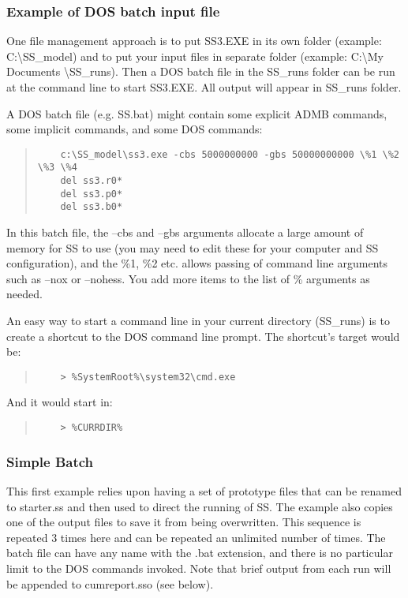 \subsubsection{Example of DOS batch input file}
One file management approach is to put SS3.EXE in its own folder (example:  C:\textbackslash SS\_model) and to put your input files in separate folder (example:  C:\textbackslash My Documents \textbackslash SS\_runs).  Then a DOS batch file in the SS\_runs folder can be run at the command line to start SS3.EXE.  All output will appear in SS\_runs folder.

A DOS batch file (e.g. SS.bat) might contain some explicit ADMB commands, some implicit commands, and some DOS commands:

\begin{quote}
	\begin{verbatim}
	c:\SS_model\ss3.exe -cbs 5000000000 -gbs 50000000000 \%1 \%2 \%3 \%4 
	del ss3.r0*
	del ss3.p0*
	del ss3.b0*
	\end{verbatim}
\end{quote}


In this batch file, the –cbs and –gbs arguments allocate a large amount of memory for SS to use (you may need to edit these for your computer and SS configuration), and the \%1, \%2 etc. allows passing of command line arguments such as –nox or –nohess.  You add more items to the list of \% arguments as needed.

An easy way to start a command line in your current directory (SS\_runs) is to create a shortcut to the DOS command line prompt.  The shortcut’s target would be:

\begin{quote}
	\begin{verbatim}
	> %SystemRoot%\system32\cmd.exe
	\end{verbatim}
\end{quote}


\noindent And it would start in:
\begin{quote}
	\begin{verbatim}
	> %CURRDIR%
	\end{verbatim}
\end{quote} 


\subsubsection{Simple Batch}
This first example relies upon having a set of prototype files that can be renamed to starter.ss and then used to direct the running of SS.  The example also copies one of the output files to save it from being overwritten.  This sequence is repeated 3 times here and can be repeated an unlimited number of times.  The batch file can have any name with the .bat extension, and there is no particular limit to the DOS commands invoked.  Note that brief output from each run will be appended to cumreport.sso (see below).

